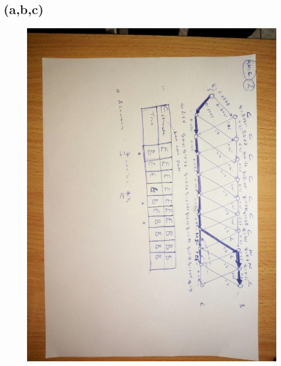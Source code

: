 \documentclass[a4paper,11pt]{article}
\begin{document}
\subsection*{(a,b,c)}
\begin{figure}[h]
  \centering
   \includegraphics[scale=0.45]{q2_a}
\end{figure}
\clearpage
\newpage
\end{document}
